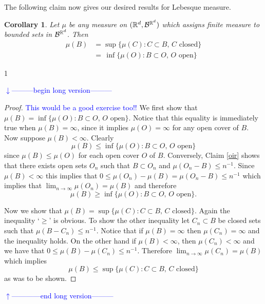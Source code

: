 \documentclass[10pt,letterpaper,twocolumn]{article}
\newtheorem{corollary}{Corollary}
\def\Ver{1}
\def\LongVer{1}
\begin{document}
The following claim now gives our desired results for Lebesque measure.
\begin{corollary}
\label{ir}
Let $\mu$ be any measure on $(\Bbb R^d,\mathcal B^{\Bbb R^d})$ which assigns finite measure to bounded sets in $\mathcal B^{\Bbb R^d}$. Then
\begin{align*}
\mathcal \mu(B)  &= \sup \{ \mathcal \mu(C):  C\subset B,\, \text{$C$ closed}\}\\
  &=\, \inf \{ \mu(O):  B\subset O,\, \text{$O$ open}\}
\end{align*}
\end{corollary}


\if\Ver\LongVer{
{\flushleft\textcolor{blue}{$\downarrow$---------begin long version---------}}\newline



\begin{proof}\textcolor{blue}{This would be a good exercise too!!}
We first show that $\mathcal \mu(B) = \inf \{ \mu(O):  B\subset O,\, \text{$O$ open}\}
$. Notice that this equality is immediately true when $\mu(B)=\infty$, since it implies $\mu(O)=\infty$ for any open cover of $B$.  Now suppose $\mu(B)<\infty$.
Clearly
\[\mathcal \mu(B) \leq \inf \{ \mu(O):  B\subset O,\, \text{$O$ open}\}\]
 since $\mu(B)\leq \mu(O)$ for each open cover $O$ of $B$. Conversely, Claim \ref{oir} shows that there exists open sets $O_n$ such that $B\subset O_n$ and $\mu(O_n-B) \leq n^{-1}$. Since $\mu(B)<\infty$ this implies that $0\leq \mu(O_n)-\mu(B)=\mu(O_n-B) \leq n^{-1}$ which implies that $\lim_{n\rightarrow \infty}\mu(O_n)= \mu(B)$ and therefore
 \[\mathcal \mu(B) \geq \inf \{ \mu(O):  B\subset O,\, \text{$O$ open}\}.\]

Now we show that $\mathcal \mu(B) = \sup \{ \mu(C): C\subset B,\, \text{$C$ closed}\}$. Again the inequality `$\geq$' is obvious. To show the other inequality let $C_n\subset B$ be closed sets such that $\mu(B-C_n)\leq n^{-1}$. Notice that if $\mu(B)=\infty$ then $\mu(C_n)=\infty$ and the inequality holds. On the other hand if $\mu(B)<\infty$, then $\mu(C_n)<\infty$ and we have that  $0\leq \mu(B)-\mu(C_n)\leq n^{-1}$. Therefore $\lim_{n\rightarrow \infty} \mu(C_n)=\mu(B)$ which implies
\[\mathcal \mu(B) \leq \sup \{ \mu(C): C\subset B,\, \text{$C$ closed}\}\]
as was to be shown.
 \end{proof}

%
{\flushleft\textcolor{blue}{$\uparrow$------------end long version---------}}\newline
} \fi
\end{document}
